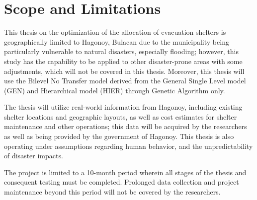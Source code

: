 \section{Scope and Limitations}

This thesis on the optimization of the allocation of evacuation shelters is geographically limited to Hagonoy, Bulacan due to the municipality being particularly vulnerable to natural disasters, especially flooding; however, this study has the capability to be applied to other disaster-prone areas with some adjustments, which will not be covered in this thesis. Moreover, this thesis will use the Bilevel No Transfer model derived from the General Single Level model (GEN) and Hierarchical model (HIER) through Genetic Algorithm only.


The thesis will utilize real-world information from Hagonoy, including existing shelter locations and geographic layouts, as well as cost estimates for shelter maintenance and other operations; this data will be acquired by the researchers as well as being provided by the government of Hagonoy. This thesis is also operating under assumptions regarding human behavior, and the unpredictability of disaster impacts.


The project is limited to a 10-month period wherein all stages of the thesis and consequent testing must be completed. Prolonged data collection and project maintenance beyond this period will not be covered by the researchers.
